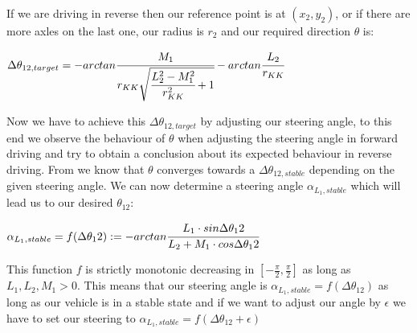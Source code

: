 If we are driving in reverse then our reference point is at $(x_2,y_2)$, or if there are more axles on the last one, our radius is $r_2$ and our required direction $\theta$ is:

\begin{center}
$\Delta \theta_{12,target}=-arctan \cfrac{M_1}{r_{KK} \sqrt{\cfrac{L_2^2-M^2_1}{r^2_{KK}}+1}}-arctan \cfrac{L_2}{r_{KK}}$
\end{center}

Now we have to achieve this $\Delta \theta_{12,target}$ by adjusting our steering angle, to this end we observe the behaviour of $\theta$ when adjusting the steering angle in forward driving and try to obtain a conclusion about its expected behaviour in reverse driving. From \cite{12} we know that $\theta$ converges towards a $\Delta \theta_{12,stable}$ depending on the given steering angle. We can now determine a steering angle $\alpha_{L_1,stable}$ which will lead us to our desired $\theta_12$:

\begin{center}
$\alpha_{L_1,stable}=f(\Delta \theta_12):=-arctan \cfrac{L_1 \cdot sin \Delta \theta_12}{L_2+M_1 \cdot cos \Delta \theta_12}$
\end{center}

This function $f$ is strictly monotonic decreasing in $\left[- \tfrac{\pi}{2},\tfrac{\pi}{2} \right]$ as long as $L_1, L_2, M_1 >0$. This means that our steering angle is $\alpha_{L_1,stable}=f(\Delta \theta_12)$ as long as our vehicle is in a stable state and if we want to adjust our angle by $\epsilon$ we have to set our steering to $\alpha_{L_1,stable}=f(\Delta \theta_12+\epsilon)$



